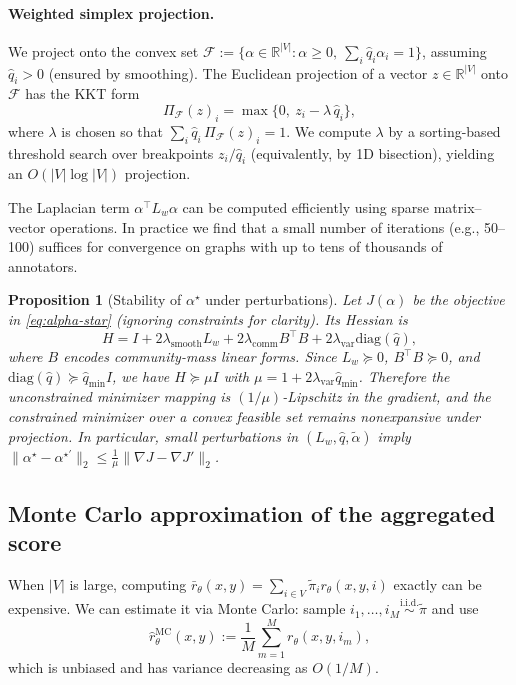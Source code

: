 \documentclass{article}
\theoremstyle{plain}
\newtheorem{proposition}[theorem]{Proposition}
\theoremstyle{definition}
\theoremstyle{remark}
\begin{document}
\paragraph{Weighted simplex projection.}
We project onto the convex set $\mathcal{F}:=\{\alpha\in\mathbb{R}^{|V|}:\alpha\ge 0,\ \sum_i \hat q_i\alpha_i=1\}$, assuming $\hat q_i>0$ (ensured by smoothing).
The Euclidean projection of a vector $z\in\mathbb{R}^{|V|}$ onto $\mathcal{F}$ has the KKT form
\[
\Pi_{\mathcal{F}}(z)_i=\max\{0,\ z_i-\lambda\,\hat q_i\},
\]
where $\lambda$ is chosen so that $\sum_i \hat q_i\,\Pi_{\mathcal{F}}(z)_i=1$.
We compute $\lambda$ by a sorting-based threshold search over breakpoints $z_i/\hat q_i$ (equivalently, by 1D bisection), yielding an $O(|V|\log|V|)$ projection.

The Laplacian term $\alpha^\top L_w \alpha$ can be computed efficiently using
sparse matrix--vector operations. In practice we find that a small number of
iterations (e.g., 50--100) suffices for convergence on graphs with up to tens
of thousands of annotators.

\begin{proposition}[Stability of $\alpha^\star$ under perturbations]
\label{prop:alpha-stability}
Let $J(\alpha)$ be the objective in \eqref{eq:alpha-star} (ignoring
constraints for clarity). Its Hessian is
\[
    H = I + 2\lambda_{\mathrm{smooth}} L_w
      + 2\lambda_{\mathrm{comm}} B^\top B
      + 2\lambda_{\mathrm{var}} \mathrm{diag}(\hat q),
\]
where $B$ encodes community-mass linear forms. Since $L_w \succeq 0$,
$B^\top B \succeq 0$, and
$\mathrm{diag}(\hat q) \succeq \hat q_{\min} I$, we have
$H \succeq \mu I$ with $\mu = 1 + 2\lambda_{\mathrm{var}} \hat q_{\min}$.
Therefore the unconstrained minimizer mapping is $(1/\mu)$-Lipschitz in
the gradient, and the constrained minimizer over a convex feasible set
remains nonexpansive under projection. In particular, small perturbations
in $(L_w, \hat q, \tilde\alpha)$ imply
$\|\alpha^\star - \alpha^{\star\prime}\|_2 \le
\frac{1}{\mu} \|\nabla J - \nabla J'\|_2$.
\end{proposition}

\subsection{Monte Carlo approximation of the aggregated score}
\label{app:mc-aggregation}

When $|V|$ is large, computing $\bar r_\theta(x,y)=\sum_{i\in V}\tilde\pi_i r_\theta(x,y,i)$ exactly can be expensive.
We can estimate it via Monte Carlo: sample $i_1,\dots,i_M \stackrel{\text{i.i.d.}}{\sim}\tilde\pi$ and use
\[
\widehat{r}_{\theta}^{\mathrm{MC}}(x,y):=\frac{1}{M}\sum_{m=1}^M r_\theta(x,y,i_m),
\]
which is unbiased and has variance decreasing as $O(1/M)$.
\end{document}
